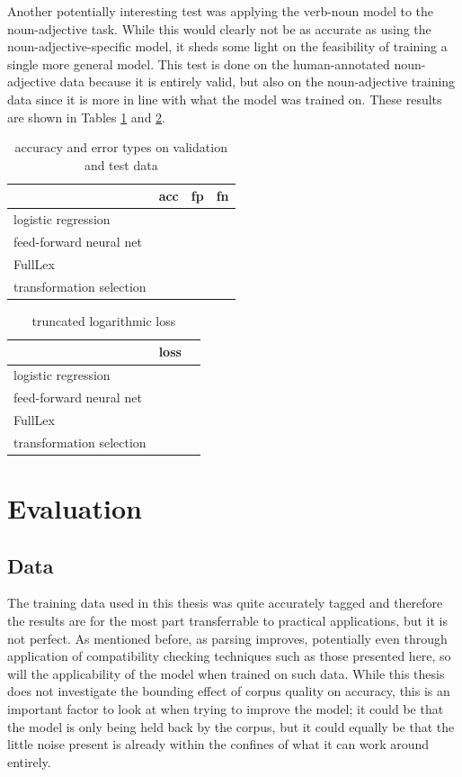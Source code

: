 \documentclass[a4paper, 12pt]{scrartcl}
\begin{document}
Another potentially interesting test was applying the verb-noun model to the noun-adjective task. While this would clearly not be as accurate as using the noun-adjective-specific model, it sheds some light on the feasibility of training a single more general model. This test is done on the human-annotated noun-adjective data because it is entirely valid, but also on the noun-adjective training data since it is more in line with what the model was trained on. These results are shown in Tables \ref{accuracy-vn-na} and \ref{loss-vn-na}.

\begin{table}[]
	\centering
	\begin{tabular}{l|lll}
		                         & acc      & fp       & fn        \\ \hline
		logistic regression      &          &          &           \\
		feed-forward neural net  &          &          &           \\
		FullLex                  &          &          &           \\
		transformation selection &          &          &
	\end{tabular}
	\caption{accuracy and error types on validation and test data}
	\label{accuracy-vn-na}
\end{table}

\begin{table}[]
	\centering
	\begin{tabular}{l|l|l}
		                         & loss      \\ \hline
		logistic regression      &           \\
		feed-forward neural net  &           \\
		FullLex                  &           \\
		transformation selection &
	\end{tabular}
	\caption{truncated logarithmic loss}
	\label{loss-vn-na}
\end{table}


\section{Evaluation}

\subsection{Data}
The training data used in this thesis was quite accurately tagged and therefore the results are for the most part transferrable to practical applications, but it is not perfect. As mentioned before, as parsing improves, potentially even through application of compatibility checking techniques such as those presented here, so will the applicability of the model when trained on such data. While this thesis does not investigate the bounding effect of corpus quality on accuracy, this is an important factor to look at when trying to improve the model; it could be that the model is only being held back by the corpus, but it could equally be that the little noise present is already within the confines of what it can work around entirely.
\end{document}
